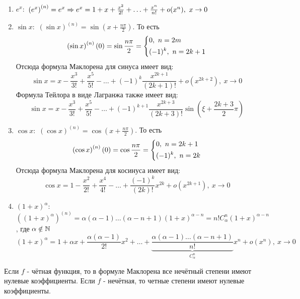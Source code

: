 \begin{enumerate}
	\item $e^x:$ $\left(e^x\right)^{(n)} = e^x \Rightarrow e^x = 1 + x + \frac{x^2}{2!} + \ldots + \frac{x^n}{n!} + o(x^n),\ x \to 0$
	
	\item $\sin x:$ $\left(\sin x\right)^{(n)} = \sin(x + \frac{n\pi}{2})$. То есть
	\[
		\left(\sin x\right)^{(n)}(0) = \sin \frac{n\pi}{2} = \left\{\begin{aligned}
			&{0,\ n = 2m}
			\\
			&{(-1)^k,\ n = 2k + 1}
		\end{aligned}\right.
	\]
	Отсюда формула Маклорена для синуса имеет вид:
	\[
		\sin x = x - \frac{x^3}{3!} + \frac{x^5}{5!} - \ldots + (-1)^k \frac{x^{2k + 1}}{(2k + 1)!} + o(x^{2k + 2}),\ x \to 0
	\]
	Формула Тейлора в виде Лагранжа также имеет вид:
	\[
		\sin x = x - \frac{x^3}{3!} + \frac{x^5}{5!} - \ldots + (-1)^{k + 1} \frac{x^{2k + 3}}{(2k + 3)!} \sin (\xi + \frac{2k + 3}{2}\pi)
	\]
	
	\item $\cos x:$ $\left(\cos x\right)^{(n)} = \cos (x + \frac{n\pi}{2})$. То есть
	\[
		\left(\cos x\right)^{(n)}(0) = \cos \frac{n\pi}{2} = \left\{\begin{aligned}
			&{0,\ n = 2k + 1}
			\\
			&{(-1)^k,\ n = 2k}
		\end{aligned}\right.
	\]
	Отсюда формула Маклорена для косинуса имеет вид:
	\[
		\cos x = 1 - \frac{x^2}{2!} + \frac{x^4}{4!} - \ldots + \frac{(-1)^k}{(2k)!}x^{2k} + o(x^{2k + 1}),\ x \to 0
	\]
	
	\item $(1 + x)^\alpha:$ $\left((1 + x)^\alpha\right)^{(n)} = \alpha(\alpha - 1)\ldots(\alpha - n + 1)(1 + x)^{\alpha - n} = n! C_{\alpha}^n (1 + x)^{\alpha - n}$, где $\alpha \notin \mathbb{N}$
	\[
		(1 + x)^\alpha = 1 + \alpha x + \frac{\alpha (\alpha - 1)}{2!}x^2 + \ldots + \underbrace{\frac{\alpha (\alpha - 1) \ldots (\alpha - n + 1)}{n!}}_{C_\alpha^n}x^n + o(x^n),\ x \to 0
	\]
\end{enumerate}

\begin{note}
	Если $f$ - чётная функция, то в формуле Маклорена все нечётный степени имеют нулевые коэффициенты. Если $f$ - нечётная, то четные степени имеют нулевые коэффициенты.
\end{note}